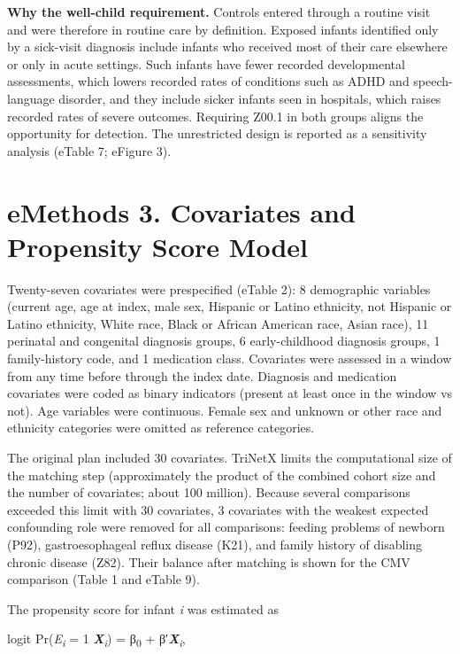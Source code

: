 \documentclass[11pt]{article}
\begin{document}
\textbf{Why the well-child requirement.} Controls entered
through a routine visit and were therefore in routine care
by definition. Exposed infants identified only by a
sick-visit diagnosis include infants who received most of
their care elsewhere or only in acute settings. Such infants
have fewer recorded developmental assessments, which lowers
recorded rates of conditions such as ADHD and
speech-language disorder, and they include sicker infants
seen in hospitals, which raises recorded rates of severe
outcomes. Requiring Z00.1 in both groups aligns the
opportunity for detection. The unrestricted design is
reported as a sensitivity analysis (eTable 7; eFigure 3).

\hypertarget{emethods-3.-covariates-and-propensity-score-model}{%
\section*{eMethods 3. Covariates and Propensity Score
Model}\label{emethods-3.-covariates-and-propensity-score-model}}

Twenty-seven covariates were prespecified (eTable 2): 8
demographic variables (current age, age at index, male sex,
Hispanic or Latino ethnicity, not Hispanic or Latino
ethnicity, White race, Black or African American race, Asian
race), 11 perinatal and congenital diagnosis groups, 6
early-childhood diagnosis groups, 1 family-history code, and
1 medication class. Covariates were assessed in a window
from any time before through the index date. Diagnosis and
medication covariates were coded as binary indicators
(present at least once in the window vs not). Age variables
were continuous. Female sex and unknown or other race and
ethnicity categories were omitted as reference categories.

The original plan included 30 covariates. TriNetX limits the
computational size of the matching step (approximately the
product of the combined cohort size and the number of
covariates; about 100 million). Because several comparisons
exceeded this limit with 30 covariates, 3 covariates with
the weakest expected confounding role were removed for all
comparisons: feeding problems of newborn (P92),
gastroesophageal reflux disease (K21), and family history of
disabling chronic disease (Z82). Their balance after
matching is shown for the CMV comparison (Table 1 and eTable
9).

The propensity score for infant \emph{i} was estimated as

logit Pr(\emph{E\textsubscript{i}} = 1 \textbar{}
\textbf{\emph{X}}\emph{\textsubscript{i}}) =
β\textsubscript{0} +
β′\textbf{\emph{X}}\emph{\textsubscript{i}},
\end{document}
